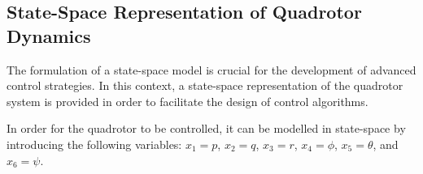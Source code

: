 \documentclass[3p,times]{elsarticle}
\begin{document}
\subsection{State-Space Representation of Quadrotor Dynamics}\label{sec:state-space}
The formulation of a state-space model is crucial for the development of advanced control strategies. In this context, a state-space representation of the quadrotor system is provided in order to facilitate the design of control algorithms.

In order for the quadrotor to be controlled, it can be modelled in state-space by introducing the following variables: $ x_1 = p$, $ x_2 = q$, $ x_3 = r$, $ x_4 = \phi$, $ x_5 = \theta$, and $x_6 = \psi$.
\end{document}
